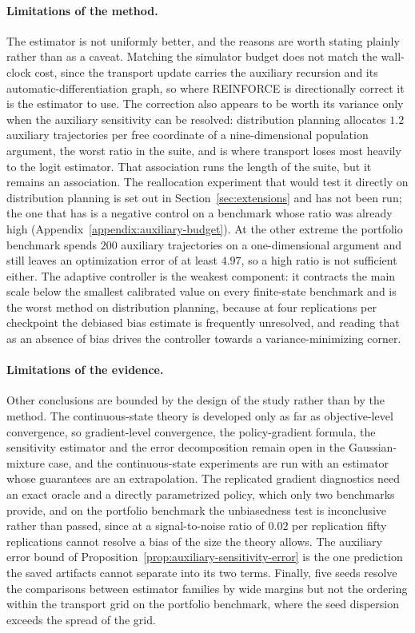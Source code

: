 \paragraph{Limitations of the method.}
The estimator is not uniformly better, and the reasons are worth stating plainly rather than as a caveat. Matching the simulator budget does not match the wall-clock cost, since the transport update carries the auxiliary recursion and its automatic-differentiation graph, so where REINFORCE is directionally correct it is the estimator to use. The correction also appears to be worth its variance only when the auxiliary sensitivity can be resolved: distribution planning allocates $1.2$ auxiliary trajectories per free coordinate of a nine-dimensional population argument, the worst ratio in the suite, and is where transport loses most heavily to the logit estimator. That association runs the length of the suite, but it remains an association. The reallocation experiment that would test it directly on distribution planning is set out in Section~\ref{sec:extensions} and has not been run; the one that has is a negative control on a benchmark whose ratio was already high (Appendix~\ref{appendix:auxiliary-budget}). At the other extreme the portfolio benchmark spends $200$ auxiliary trajectories on a one-dimensional argument and still leaves an optimization error of at least $4.97$, so a high ratio is not sufficient either. The adaptive controller is the weakest component: it contracts the main scale below the smallest calibrated value on every finite-state benchmark and is the worst method on distribution planning, because at four replications per checkpoint the debiased bias estimate is frequently unresolved, and reading that as an absence of bias drives the controller towards a variance-minimizing corner.

\paragraph{Limitations of the evidence.}
Other conclusions are bounded by the design of the study rather than by the method. The continuous-state theory is developed only as far as objective-level convergence, so gradient-level convergence, the policy-gradient formula, the sensitivity estimator and the error decomposition remain open in the Gaussian-mixture case, and the continuous-state experiments are run with an estimator whose guarantees are an extrapolation. The replicated gradient diagnostics need an exact oracle and a directly parametrized policy, which only two benchmarks provide, and on the portfolio benchmark the unbiasedness test is inconclusive rather than passed, since at a signal-to-noise ratio of $0.02$ per replication fifty replications cannot resolve a bias of the size the theory allows. The auxiliary error bound of Proposition~\ref{prop:auxiliary-sensitivity-error} is the one prediction the saved artifacts cannot separate into its two terms. Finally, five seeds resolve the comparisons between estimator families by wide margins but not the ordering within the transport grid on the portfolio benchmark, where the seed dispersion exceeds the spread of the grid.

